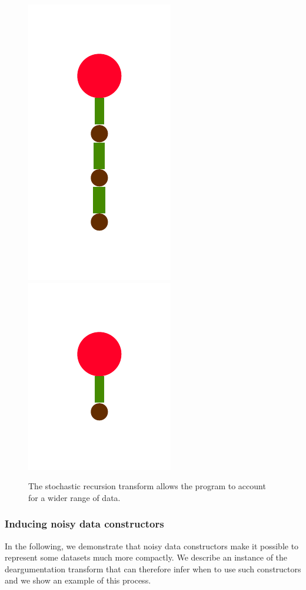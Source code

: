 \documentclass[a4paper,10pt]{article}
\begin{document}
\begin{figure}
{    \includegraphics[scale=.2]{../figures/vector/4-2-3-recursion-post-7.pdf}
    \includegraphics[scale=.2]{../figures/vector/4-2-3-recursion-post-8.pdf}
    \label{fig:rec-transformed}    
    }
  \caption{The stochastic recursion transform allows the program to account for a wider range of data.}
  \label{fig:rec}
\end{figure}


\subsubsection{Inducing noisy data constructors}

In the following, we demonstrate that noisy data constructors make it possible to represent some datasets much more compactly. We describe an instance of the deargumentation transform that can therefore infer when to use such constructors and we show an example of this process.
\end{document}
